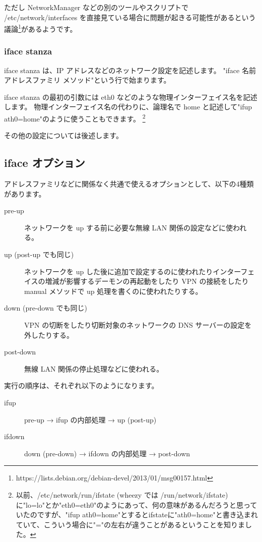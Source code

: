 \documentclass[mingoth,a4paper,twoside]{jsarticle}
\begin{document}
ただし NetworkManager などの別のツールやスクリプトで /etc/network/interfaces を直接見ている場合に問題が起きる可能性があるという議論\footnote{https://lists.debian.org/debian-devel/2013/01/msg00157.html}があるようです。

\subsubsection{iface stanza}

iface stanza は、IP アドレスなどのネットワーク設定を記述します。
"iface 名前 アドレスファミリ メソッド"という行で始まります。

iface stanza の最初の引数には eth0 などのような物理インターフェイス名を記述します。
物理インターフェイス名の代わりに、論理名で home と記述して"ifup ath0=home"のように使うこともできます。
\footnote{以前、/etc/network/run/ifstate (wheezy では /run/network/ifstate) に"lo=lo"とか"eth0=eth0"のようにあって、何の意味があるんだろうと思っていたのですが、"ifup ath0=home"とするとifstateに"ath0=home"と書き込まれていて、こういう場合に"="の左右が違うことがあるということを知りました。}

その他の設定については後述します。

\subsection{iface オプション}
アドレスファミリなどに関係なく共通で使えるオプションとして、以下の4種類があります。


\begin{description}
\item[pre-up] ネットワークを up する前に必要な無線 LAN 関係の設定などに使われる。
\item[up (post-up でも同じ)] ネットワークを up した後に追加で設定するのに使われたりインターフェイスの増減が影響するデーモンの再起動をしたり VPN の接続をしたり manual メソッドで up 処理を書くのに使われたりする。
\item[down (pre-down でも同じ)] VPN の切断をしたり切断対象のネットワークの DNS サーバーの設定を外したりする。
\item[post-down] 無線 LAN 関係の停止処理などに使われる。
\end{description}

実行の順序は、それぞれ以下のようになります。

\begin{description}
\item[ifup] pre-up → ifup の内部処理 → up (post-up)
\item[ifdown] down (pre-down) → ifdown の内部処理 → post-down
\end{description}
\end{document}
